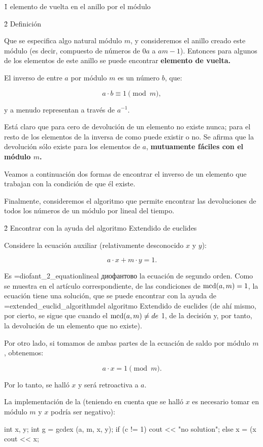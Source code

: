 \h1{ elemento de vuelta en el anillo por el módulo }


\h2{ Definición }

Que se especifica algo natural módulo $m$, y consideremos el anillo creado este módulo (es decir, compuesto de números de $0 a$ a $a m-1$). Entonces para algunos de los elementos de este anillo se puede encontrar \bf{elemento de vuelta}.

El inverso de entre $a$ por módulo $m$ es un número $b$, que:

$$ a \cdot b \equiv 1 \pmod m, $$

y a menudo representan a través de $a^{-1}$.

Está claro que para cero de devolución de un elemento no existe nunca; para el resto de los elementos de la inversa de como puede existir o no. Se afirma que la devolución sólo existe para los elementos de $a$, \bf{mutuamente fáciles} con el módulo $m$.

Veamos a continuación dos formas de encontrar el inverso de un elemento que trabajan con la condición de que él existe.

Finalmente, consideremos el algoritmo que permite encontrar las devoluciones de todos los números de un módulo por lineal del tiempo.


\h2{ Encontrar con la ayuda del algoritmo Extendido de euclides }

Considere la ecuación auxiliar (relativamente desconocido $x$ y $y$):

$$ a \cdot x + m \cdot y = 1. $$

Es \algohref=diofant_2_equation{lineal диофантово la ecuación de segundo orden}. Como se muestra en el artículo correspondiente, de las condiciones de ${\rm mcd}(a,m)=1$, la ecuación tiene una solución, que se puede encontrar con la ayuda de \algohref=extended_euclid_algorithm{del algoritmo Extendido de euclides} (de ahí mismo, por cierto, se sigue que cuando el ${\rm mcd}(a,m) \ne de$ 1, de la decisión y, por tanto, la devolución de un elemento que no existe).

Por otro lado, si tomamos de ambas partes de la ecuación de saldo por módulo $m$, obtenemos:

$$ a \cdot x = 1 \pmod m. $$

Por lo tanto, se halló $x$ y será retroactiva a $a$.

La implementación de la (teniendo en cuenta que se halló $x$ es necesario tomar en módulo $m$ y $x$ podría ser negativo):

\code
int x, y;
int g = gcdex (a, m, x, y);
if (c != 1)
cout << "no solution";
else {
x = (x %
cout << x;
}
\endcode

